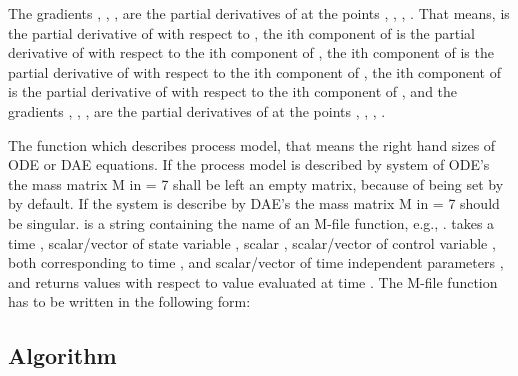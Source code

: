 \begin{description}
  The gradients , , ,
   are the partial derivatives of  at the
  points , , , . That means,
   is the partial derivative of  with respect
  to , the ith component of  is the partial
  derivative of  with respect to the ith component of
  , the ith component of  is the partial
  derivative of  with respect to the ith component of
  , the ith component of  is the partial
  derivative of  with respect to the ith component of
  , and the gradients , ,
  ,  are the partial derivatives of
   at the points , , ,
  . 
\item[\argfun{process}] The function which describes process model,
  that means the right hand sizes of ODE or DAE equations. If the
  process model is described by system of ODE's the mass matrix M in
   = 7 shall be left an empty matrix, because of being
  set by  by default. If the system is describe by DAE's
  the mass matrix M in  = 7 should be singular.
   is a string containing the name of an M-file
  function, e.g., .  takes a time
  , scalar/vector of state variable , scalar
  , scalar/vector of control variable , both
  corresponding to time , and scalar/vector of time
  independent parameters , and returns  values
  with respect to  value evaluated at time .
  The M-file function has to be written in the following form: 
  {\small }
\end{description}


\subsection{Algorithm}


